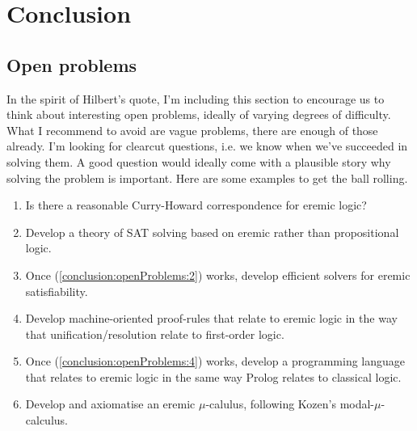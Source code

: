 \section{Conclusion}\label{conclusion}



\subsection{Open problems} In the spirit of Hilbert's quote, I'm including this
section to encourage us to think about interesting open problems,
ideally of varying degrees of difficulty. What I recommend to avoid
are vague problems, there are enough of those already. I'm looking for
clearcut questions, i.e. we know when we've succeeded in solving them.
A good question would ideally come with a plausible story why solving
the problem is important.  Here are some examples to get the ball
rolling.

\begin{enumerate}

\item Is there a reasonable Curry-Howard correspondence for eremic
  logic?

\item\label{conclusion:openProblems:2}  Develop a theory of SAT solving based on eremic rather than
  propositional logic.

\item Once (\ref{conclusion:openProblems:2}) works, develop efficient
  solvers for eremic satisfiability.

\item\label{conclusion:openProblems:4} Develop machine-oriented proof-rules that relate to eremic logic
  in the way that unification/resolution relate to first-order logic.

\item Once (\ref{conclusion:openProblems:4}) works, develop a
  programming language that relates to eremic logic in the same way
  Prolog relates to classical logic.

\item Develop and axiomatise an eremic $\mu$-calulus, following
  Kozen's modal-$\mu$-calculus.

\end{enumerate}

